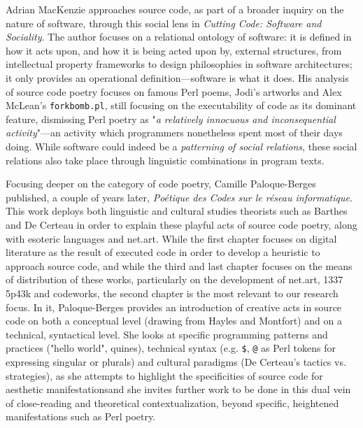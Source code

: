 Adrian MacKenzie approaches source code, as part of a broader inquiry on the nature of software, through this social lens in \emph{Cutting Code: Software and Sociality}\cite{mackenzie_cutting_2006}. The author focuses on a relational ontology of software: it is defined in how it acts upon, and how it is being acted upon by, external structures, from intellectual property frameworks to design philosophies in software architectures; it only provides an operational definition—software is what it does. His analysis of source code poetry focuses on famous Perl poems, Jodi's artworks and Alex McLean's \lstinline{forkbomb.pl}, still focusing on the executability of code as its dominant feature, dismissing Perl poetry as "\emph{a relatively innocuous and inconsequential activity}"\cite{mackenzie_cutting_2006}—an activity which programmers nonetheless spent most of their days doing. While software could indeed be a \emph{patterning of social relations}, these social relations also take place through linguistic combinations in program texts.

Focusing deeper on the category of code poetry, Camille Paloque-Berges published, a couple of years later, \emph{Poétique des Codes sur le réseau informatique}\cite{paloque-berges_poetique_2009}. This work deploys both linguistic and cultural studies theorists such as Barthes and De Certeau in order to explain these playful acts of source code poetry, along with esoteric languages and net.art. While the first chapter focuses on digital literature as the result of executed code in order to develop a heuristic to approach source code, and while the third and last chapter focuses on the means of distribution of these works, particularly on the development of net.art, 1337 5p43k and codeworks, the second chapter is the most relevant to our research focus. In it, Paloque-Berges provides an introduction of creative acts in source code on both a conceptual level (drawing from Hayles and Montfort) and on a technical, syntactical level. She looks at specific programming patterns and practices ("hello world", quines), technical syntax (e.g. \lstinline{$}, \lstinline{@} as Perl tokens for expressing singular or plurals) and cultural paradigms (De Certeau's tactics vs. strategies), as she attempts to highlight the specificities of source code for aesthetic manifestationsand she invites further work to be done in this dual vein of close-reading and theoretical contextualization, beyond specific, heightened manifestations such as Perl poetry.

